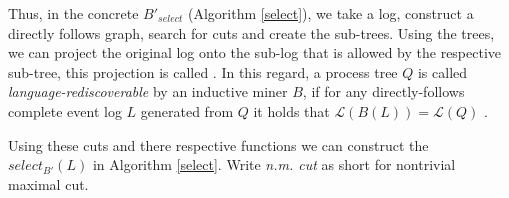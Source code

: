 \documentclass[a4paper]{IEEEtran}
\begin{document}

Thus, in the concrete $B'_{select}$ (Algorithm \ref{select}), we take a log, construct a directly follows graph, search for cuts and create the sub-trees. Using the trees, we can project the original log onto the sub-log that is allowed by the respective sub-tree, this projection is called . In this regard, a process tree $ Q $ is called \textit{language-rediscoverable} by an inductive miner $B$, if for any directly-follows complete event log $L$ generated from $Q$ it holds that $\mathcal{L}(B(L)) = \mathcal{L}(Q)$ \cite{process_mining}.

Using these cuts and there respective  functions we can construct the $select_{B'}(L)$ in Algorithm \ref{select}. Write \textit{n.m. cut} as short for nontrivial maximal cut.
\end{document}
